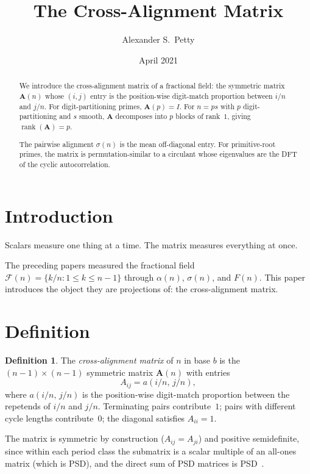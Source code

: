 \documentclass[12pt]{amsart}
\title{The Cross-Alignment Matrix}
\author{Alexander S.\ Petty}
\date{April 2021}
\theoremstyle{definition}
\newtheorem{definition}[theorem]{Definition}
\theoremstyle{remark}
\begin{document}
\begin{abstract}
We introduce the cross-alignment matrix of a fractional
field: the symmetric matrix $\mathbf{A}(n)$ whose
$(i,j)$ entry is the position-wise digit-match
proportion between $i/n$ and $j/n$. For
digit-partitioning primes, $\mathbf{A}(p) = I$.
For $n = ps$ with $p$ digit-partitioning and $s$
smooth, $\mathbf{A}$ decomposes into $p$ blocks of
rank~$1$, giving $\operatorname{rank}(\mathbf{A}) = p$.

The pairwise alignment $\sigma(n)$ is the mean
off-diagonal entry. For primitive-root primes, the
matrix is permutation-similar to a circulant whose
eigenvalues are the DFT of the cyclic autocorrelation.
\end{abstract}
\maketitle

\section{Introduction}

Scalars measure one thing at a time. The matrix
measures everything at once.

The preceding papers measured the fractional field
$\mathcal{F}(n) = \{k/n : 1 \le k \le n{-}1\}$ through
$\alpha(n)$, $\sigma(n)$, and $F(n)$. This paper
introduces the object they are projections of: the
cross-alignment matrix.

\section{Definition}

\begin{definition}
The \emph{cross-alignment matrix} of $n$ in base $b$ is the
$(n{-}1) \times (n{-}1)$ symmetric matrix $\mathbf{A}(n)$ with
entries
\[
A_{ij} = a(i/n,\, j/n),
\]
where $a(i/n,\, j/n)$ is the position-wise digit-match proportion
between the repetends of $i/n$ and $j/n$. Terminating pairs
contribute~$1$; pairs with different cycle lengths contribute~$0$;
the diagonal satisfies $A_{ii} = 1$.
\end{definition}

The matrix is symmetric by construction ($A_{ij} = A_{ji}$)
and positive semidefinite, since within each period class
the submatrix is a scalar multiple of an all-ones matrix
(which is PSD), and the direct sum of PSD matrices is
PSD~\cite{horn}.
\end{document}
